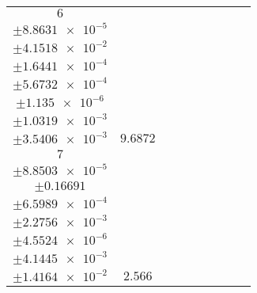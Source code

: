 \documentclass[8pt]{article}
\begin{document}
\begin{longtable}[l]{c c c c c c c c c}
$\num{6}$ & \begin{tabular}[c]{@{}c@{}}$\num{0.12284}$ \\ $\pm\num{8.8631e-5}$\end{tabular} & \begin{tabular}[c]{@{}c@{}}$\num{0.33701}$ \\ $\pm\num{4.1518e-2}$\end{tabular} & \begin{tabular}[c]{@{}c@{}}$\num{7.3994}$ \\ $\pm\num{1.6441e-4}$\end{tabular} & \begin{tabular}[c]{@{}c@{}}$\num{1.3793e+3}$ \\ $\pm\num{5.6732e-4}$\end{tabular} & \begin{tabular}[c]{@{}c@{}}$\num{2.7594}$ \\ $\pm\num{1.135e-6}$\end{tabular} & \begin{tabular}[c]{@{}c@{}}$\num{1.178}$ \\ $\pm\num{1.0319e-3}$\end{tabular} & \begin{tabular}[c]{@{}c@{}}$\num{4.2427}$ \\ $\pm\num{3.5406e-3}$\end{tabular} & $\num{9.6872}$\\
$\num{7}$ & \begin{tabular}[c]{@{}c@{}}$\num{3.0516e-2}$ \\ $\pm\num{8.8503e-5}$\end{tabular} & \begin{tabular}[c]{@{}c@{}}$\num{2.4834e-2}$ \\ $\pm\num{0.16691}$\end{tabular} & \begin{tabular}[c]{@{}c@{}}$\num{-15.889}$ \\ $\pm\num{6.5989e-4}$\end{tabular} & \begin{tabular}[c]{@{}c@{}}$\num{1.4224e+3}$ \\ $\pm\num{2.2756e-3}$\end{tabular} & \begin{tabular}[c]{@{}c@{}}$\num{2.8457}$ \\ $\pm\num{4.5524e-6}$\end{tabular} & \begin{tabular}[c]{@{}c@{}}$\num{1.1768}$ \\ $\pm\num{4.1445e-3}$\end{tabular} & \begin{tabular}[c]{@{}c@{}}$\num{4.2304}$ \\ $\pm\num{1.4164e-2}$\end{tabular} & $\num{2.566}$\\

\end{longtable}
\end{document}
